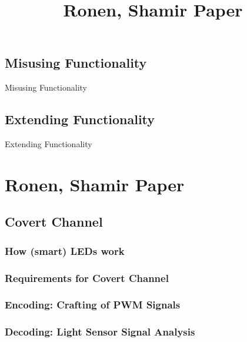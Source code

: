 \documentclass[11pt,t,usepdftitle=false,aspectratio=169]{beamer}
\begin{document}
\subsection{Misusing Functionality}
\begin{frame}{Misusing Functionality}

\end{frame}

\subsection{Extending Functionality}
\begin{frame}{Extending Functionality}

\end{frame}

\title{Ronen, Shamir Paper}
\subtitle{}
\section{Ronen, Shamir Paper}

\subsection{Covert Channel}%
\label{sub:covert_channel}

\subsubsection{How (smart) LEDs work}%
\label{sub:how_smart_leds_work}

\subsubsection{Requirements for Covert Channel}%
\label{sub:requirements_for_covert_channel}

\subsubsection{Encoding: Crafting of PWM Signals}%
\label{sub:encoding_crafting_of_pwm_signals}

\subsubsection{Decoding: Light Sensor Signal Analysis}%
\label{sub:decoding_light_sensor_signal_analysis}
\end{document}
